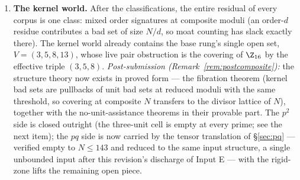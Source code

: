 \begin{enumerate}[leftmargin=1.7em,itemsep=4pt]
\item \textbf{The kernel world.} After the classifications, the entire
  residual of every corpus is one class: mixed order signatures at
  composite moduli (an order-$d$ residue contributes a bad set of size
  $N/d$, so moat counting has slack exactly there). The kernel world
  already contains the base rung's single open set,
  $V=(3,5,8,13)$, whose live pair obstruction is the covering of
  $\Z_{16}$ by the effective triple $(3,5,8)$. \emph{Post-submission
  (Remark~\ref{rem:postcomposite}):} the structure theory now exists in
  proved form --- the fibration theorem (kernel bad sets are pullbacks of
  unit bad sets at reduced moduli with the same threshold, so covering at
  composite $N$ transfers to the divisor lattice of $N$), together with
  the no-unit-assistance theorems in their provable part. The $p^2$ side
  is closed outright (the three-unit cell is empty at every prime; see
  the next item); the $pq$ side is now carried by the tensor translation
  of \S\ref{sec:pq} --- verified empty to $N\le143$ and reduced to the
  same input structure, a single unbounded input after this revision's
  discharge of Input E --- with the rigid-zone lifts the remaining open
  piece.


\end{enumerate}

